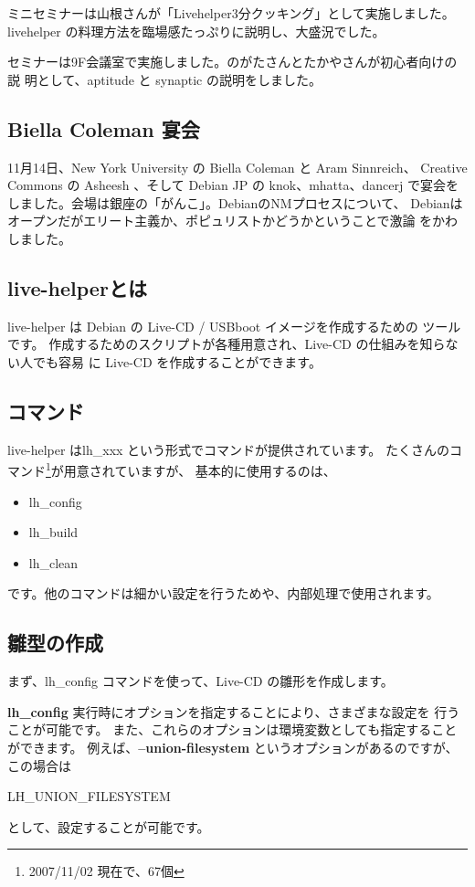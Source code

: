 \documentclass[mingoth,a4paper]{jsarticle}
\begin{document}
ミニセミナーは山根さんが「Livehelper3分クッキング」として実施しました。
livehelper の料理方法を臨場感たっぷりに説明し、大盛況でした。

セミナーは9F会議室で実施しました。のがたさんとたかやさんが初心者向けの説
明として、aptitude と synaptic の説明をしました。


\subsection{Biella Coleman 宴会}

11月14日、New York University の Biella Coleman と Aram Sinnreich、
Creative Commons の Asheesh 、そして Debian JP の knok、mhatta、dancerj
で宴会をしました。会場は銀座の「がんこ」。DebianのNMプロセスについて、
Debianはオープンだがエリート主義か、ポピュリストかどうかということで激論
をかわしました。

\label{live-helper}
\subsection{live-helperとは}
live-helper は Debian の Live-CD / USBboot イメージを作成するための
ツールです。
作成するためのスクリプトが各種用意され、Live-CD の仕組みを知らない人でも容易
に Live-CD を作成することができます。

\subsection{コマンド}
live-helper はlh\_xxx という形式でコマンドが提供されています。
たくさんのコマンド\footnote{2007/11/02 現在で、67個}が用意されていますが、
基本的に使用するのは、
\begin{itemize}
  \item lh\_config
  \item lh\_build
  \item lh\_clean
\end{itemize}
です。他のコマンドは細かい設定を行うためや、内部処理で使用されます。

\subsection{雛型の作成}
まず、lh\_config コマンドを使って、Live-CD の雛形を作成します。
\begin{commandline}
\end{commandline}

{\bf lh\_config} 実行時にオプションを指定することにより、さまざまな設定を
行うことが可能です。
また、これらのオプションは環境変数としても指定することができます。
例えば、{\bf --union-filesystem} というオプションがあるのですが、この場合は
\begin{commandline}
LH_UNION_FILESYSTEM
\end{commandline}
として、設定することが可能です。
\end{document}
